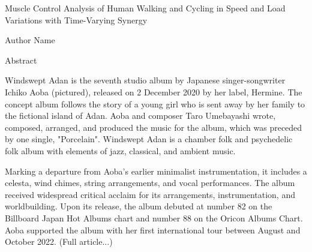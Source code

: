 \pagestyle{plain}

\begin{center}
    Muscle Control Analysis of Human Walking and Cycling in Speed and Load Variations with Time-Varying Synergy
\end{center}
\vspace{10mm}
\begin{center}
    Author Name
\end{center}
\vspace{10mm}

\begin{center}
    Abstract
\end{center}
\vspace{10mm}

Windswept Adan is the seventh studio album by Japanese singer-songwriter Ichiko Aoba (pictured), released on 2 December 2020 by her label, Hermine.
The concept album follows the story of a young girl who is sent away by her family to the fictional island of Adan.
Aoba and composer Taro Umebayashi wrote, composed, arranged, and produced the music for the album, which was preceded by one single, "Porcelain".
Windswept Adan is a chamber folk and psychedelic folk album with elements of jazz, classical, and ambient music.

Marking a departure from Aoba's earlier minimalist instrumentation, it includes a celesta, wind chimes, string arrangements, and vocal performances.
The album received widespread critical acclaim for its arrangements, instrumentation, and worldbuilding.
Upon its release, the album debuted at number 82 on the Billboard Japan Hot Albums chart and number 88 on the Oricon Albums Chart.
Aoba supported the album with her first international tour between August and October 2022.
(Full article...)


\clearpage
\pagestyle{fancy}